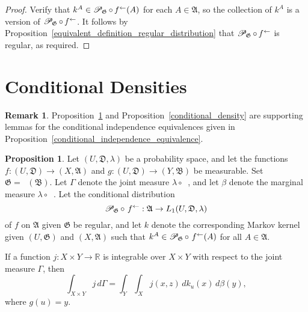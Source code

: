 \documentclass[
twoside=true,
paper=letter,
fontsize=9pt,
pagesize=auto,
leqno,
openany,
headsepline,
overfullrule,
]{scrbook}
\theoremstyle{plain}
\theoremstyle{plain}
\theoremstyle{definition}
\newtheorem{rmk}[thm]{Remark}
\theoremstyle{bfnoteitalic}
\newtheorem{propboldnote}[thm]{Proposition}
\theoremstyle{bfnoteroman}
\newcommand{\sigalg}[1]{\mathfrak{#1}}
\newcommand{\cali}[1]{\mathscr{#1}}
\newcommand{\condprobop}[1]{\mathop{\cali{P}\hspace{-1pt}}\nolimits_{#1}}
\newcommand{\preimage}[1]{\mathop{#1^{\leftarrow}}}
\newcommand{\R}{\mathbb{R}}
\newcommand{\sigmaalgebra}{\sigalg{A}}
\newcommand{\sigmaalgebraii}{\sigalg{B}}
\newcommand{\funcf}{f}
\newcommand{\funcg}{g}
\newcommand{\funcj}{j}
\newcommand{\funck}{k}
\newcommand{\function}{f}
\newcommand{\measurespace}{X}
\newcommand{\measurespaceii}{Y}
\newcommand{\mspaceelt}{x}
\newcommand{\mspaceeltii}{y}
\newcommand{\mspaceeltiii}{z}
\newcommand{\measureiii}{\lambda}
\newcommand{\measlambda}{\lambda}
\newcommand{\seti}{A}
\newcommand{\uspace}{U}%
\newcommand{\uspaceelt}{u}
\newcommand{\uspacesig}{\sigalg{D}}
\newcommand{\measonprod}{\Gamma}%
\newcommand{\marginaltwo}{\beta}%
\begin{document}
\begin{proof}
Verify that
$\funck^\seti \in \condprobop{\sigalg{G}}\circ \preimage{\funcf}(\seti)$ for each $\seti\in\sigmaalgebra$, so the collection of $\funck^\seti$ is a version of
$\condprobop{\sigalg{G}}\circ \preimage{\funcf}$. It follows by Proposition~\ref{equivalent_definition_regular_distribution} that
$\condprobop{\sigalg{G}}\circ \preimage{\funcf}$ is regular, as required.


\end{proof}




\section{Conditional Densities}
\begin{rmk}
Proposition~\ref{joint_decomposition} and Proposition~\ref{conditional_density} are supporting lemmas for the conditional independence equivalences given in Proposition~\ref{conditional_independence_equivalence}.
\end{rmk}

\begin{propboldnote}\label{joint_decomposition}
Let
$(\uspace, \uspacesig, \measureiii)$
be a probability space, and let the functions
$\function:(\uspace,\uspacesig)\to (\measurespace,\sigmaalgebra)$
and
$\funcg:(\uspace,\uspacesig)\to (\measurespaceii,\sigmaalgebraii)$
be measurable. Set
$\sigalg{G} = \preimage{\funcg}(\sigmaalgebraii)$.
Let $\measonprod$ denote the joint measure  $\measureiii\circ\preimage{(\function,\funcg)}$,
and let $\marginaltwo$ denote the marginal measure $\measlambda\circ\preimage{\funcg}$.
Let the conditional distribution
\[
\condprobop{\sigalg{G}}\circ\, \preimage{\function}:
\sigmaalgebra \to L_1(\uspace,\uspacesig,\measureiii)
\]
of $\function$ on $\sigmaalgebra$ given $\sigalg{G}$
be regular, and let
$\funck$
denote the corresponding Markov kernel given
$(\uspace,\sigalg{G})$ and $(\measurespace,\sigmaalgebra)$ such that
$\funck^\seti\in
\condprobop{\sigalg{G}}\circ\, \preimage{\function}(\seti)$
for all $\seti\in\sigmaalgebra$.

If a function
$j:\measurespace\times\measurespaceii \to \R$
is integrable over
$\measurespace\times\measurespaceii$
with respect to the joint measure $\measonprod$,
then
\[
\int_{\measurespace\times\measurespaceii} \funcj \,
d \measonprod
=
\int_\measurespaceii\int_\measurespace
\funcj(\mspaceelt,\mspaceeltiii) \,
d \funck_\uspaceelt(\mspaceelt)\,
d \marginaltwo(\mspaceeltii),
\]
where  $\funcg(\uspaceelt) = \mspaceeltii$.
\end{propboldnote}
\end{document}
